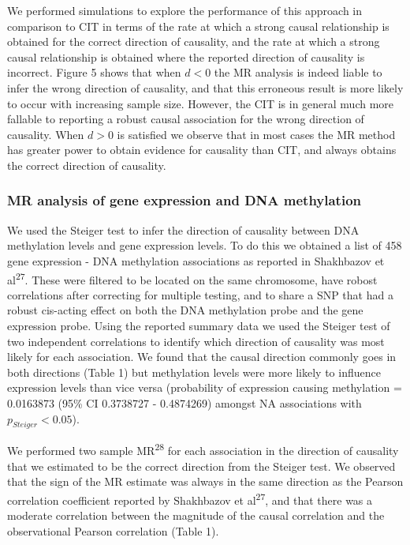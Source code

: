\documentclass[]{article}
\begin{document}
We performed simulations to explore the performance of this approach in
comparison to CIT in terms of the rate at which a strong causal
relationship is obtained for the correct direction of causality, and the
rate at which a strong causal relationship is obtained where the
reported direction of causality is incorrect. Figure 5 shows that when
\(d < 0\) the MR analysis is indeed liable to infer the wrong direction
of causality, and that this erroneous result is more likely to occur
with increasing sample size. However, the CIT is in general much more
fallable to reporting a robust causal association for the wrong
direction of causality. When \(d > 0\) is satisfied we observe that in
most cases the MR method has greater power to obtain evidence for
causality than CIT, and always obtains the correct direction of
causality.

\subsubsection{MR analysis of gene expression and DNA
methylation}\label{mr-analysis-of-gene-expression-and-dna-methylation}

We used the Steiger test to infer the direction of causality between DNA
methylation levels and gene expression levels. To do this we obtained a
list of 458 gene expression - DNA methylation associations as reported
in Shakhbazov et al\textsuperscript{27}. These were filtered to be
located on the same chromosome, have robost correlations after
correcting for multiple testing, and to share a SNP that had a robust
cis-acting effect on both the DNA methylation probe and the gene
expression probe. Using the reported summary data we used the Steiger
test of two independent correlations to identify which direction of
causality was most likely for each association. We found that the causal
direction commonly goes in both directions (Table 1) but methylation
levels were more likely to influence expression levels than vice versa
(probability of expression causing methylation = 0.0163873 (95\% CI
0.3738727 - 0.4874269) amongst NA associations with
\(p_{Steiger} < 0.05\)).

We performed two sample MR\textsuperscript{28} for each association in
the direction of causality that we estimated to be the correct direction
from the Steiger test. We observed that the sign of the MR estimate was
always in the same direction as the Pearson correlation coefficient
reported by Shakhbazov et al\textsuperscript{27}, and that there was a
moderate correlation between the magnitude of the causal correlation and
the observational Pearson correlation (Table 1).
\end{document}
